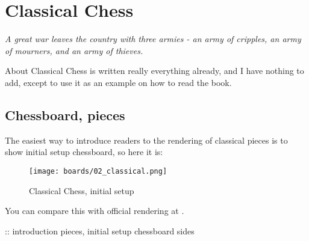 

\chapter*{Classical Chess}
\label{ch:Classical Chess}

\begin{flushright}
\parbox{0.8\textwidth}{
\emph{A great war leaves the country with three armies -
an army of cripples, an army of mourners, and an army of thieves. \newline
{} } }
\end{flushright}

\noindent
About Classical Chess is written really everything already, and I have
nothing to add, except to use it as an example on how to read the book.

\clearpage %

\section*{Chessboard, pieces}
\label{sec:Classical Chess/Chessboard, pieces}

The easiest way to introduce readers to the rendering of classical pieces
is to show initial setup chessboard, so here it is:

\noindent
\begin{figure}[!h]
\texttt{[image: boards/02\_classical.png]}
\caption{Classical Chess, initial setup}
\label{fig:02_classical}
\end{figure}

\noindent
You can compare this with official rendering at .

\clearpage %

\noindent
\TODO :: introduction \newline
\textrightarrow pieces, initial setup \newline
\textrightarrow chessboard sides \newline

